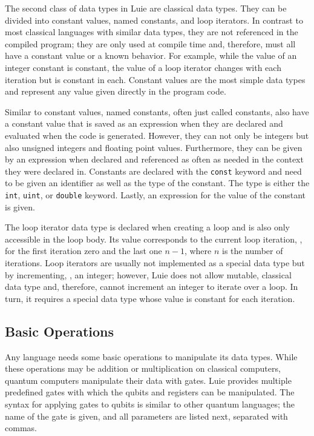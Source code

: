 The second class of data types in Luie are classical data types. They can be divided into constant values, named constants, and loop iterators. In contrast to most classical languages with similar data types, they are not referenced in the compiled program; they are only used at compile time and, therefore, must all have a constant value or a known behavior. For example, while the value of an integer constant is constant, the value of a loop iterator changes with each iteration but is constant in each.
Constant values are the most simple data types and represent any value given directly in the program code. 

Similar to constant values, named constants, often just called constants, also have a constant value that is saved as an expression when they are declared and evaluated when the code is generated. However, they can not only be integers but also unsigned integers and floating point values. Furthermore, they can be given by an expression when declared and referenced as often as needed in the context they were declared in. Constants are declared with the \texttt{const} keyword and need to be given an identifier as well as the type of the constant. The type is either the \texttt{int}, \texttt{uint}, or \texttt{double} keyword. Lastly, an expression for the value of the constant is given.

The loop iterator data type is declared when creating a loop and is also only accessible in the loop body. Its value corresponds to the current loop iteration, \eg, for the first iteration zero and the last one $n - 1$, where $n$ is the number of iterations. Loop iterators are usually not implemented as a special data type but by incrementing, \eg, an integer; however, Luie does not allow mutable, classical data type and, therefore, cannot increment an integer to iterate over a loop. In turn, it requires a special data type whose value is constant for each iteration.

\subsection{Basic Operations}
\label{sec:concept_basicOperations}
Any language needs some basic operations to manipulate its data types. While these operations may be addition or multiplication on classical computers, quantum computers manipulate their data with gates. Luie provides multiple predefined gates with which the qubits and registers can be manipulated. The syntax for applying gates to qubits is similar to other quantum languages; the name of the gate is given, and all parameters are listed next, separated with commas.

